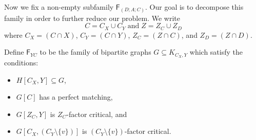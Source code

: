 \documentclass[10pt]{amsart}
\theoremstyle{definition}
\begin{document}
	
	Now we fix a non-empty subfamily $\mathsf{F}_{(D;A;C)}$. 
	Our goal is to decompose this family in order to further reduce our problem. We write 
	\[C = C_X \cup C_Y \; \text{and}\; Z = Z_C \cup Z_D\]  where  $C_X = (C\cap X)$,  $C_Y = (C\cap Y)$,  $Z_C = (Z\cap C)$,  and $Z_D = (Z\cap D)$. 
	
	Define $\mathsf{F}_{YC}$
	to be the family of bipartite graphs $G \subseteq K_{C_X, Y}$ which satisfy the conditions:
	\begin{itemize}
		\item $H[C_X, Y]\subseteq G$, 
		\item $G[C]$ has a perfect matching, 
		\item $G[Z_C, Y]$ is $Z_C$-factor critical, and
		\item $G[C_X, (C_Y\setminus \{v\})]$ is $(C_Y\setminus\{v\})$-factor critical.
	\end{itemize}
	
\end{document}
